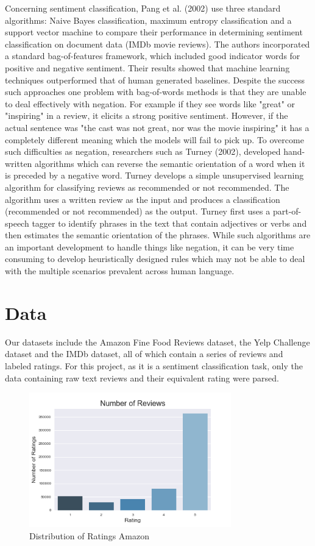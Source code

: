 \documentclass[conference]{IEEEtran}
\begin{document}
Concerning sentiment classification, Pang et al. (2002) use three standard algorithms: Naive Bayes classification, maximum entropy classification and a support vector machine to compare their performance in determining sentiment classification on document data (IMDb movie reviews). The authors incorporated a standard bag-of-features framework, which included good indicator words for positive and negative sentiment. Their results showed that machine learning techniques outperformed that of human generated baselines. Despite the success such approaches one problem with bag-of-words methods is that they are unable to deal effectively with negation. For example if they see words like "great" or "inspiring" in a review, it elicits a strong positive sentiment. However, if the actual sentence was "the cast was not great, nor was the movie inspiring" it has a completely different meaning which the models will fail to pick up. To overcome such difficulties as negation, researchers such as Turney (2002), developed hand-written algorithms which can reverse the semantic orientation of a word when it is preceded by a negative word. Turney develops a simple unsupervised learning algorithm for classifying reviews as recommended or not recommended.  The algorithm uses a written review as the input and produces a classification (recommended or not recommended) as the output. Turney first uses a part-of-speech tagger to identify phrases in the text that contain adjectives or verbs and then estimates the semantic orientation of the phrases. While such algorithms are an important development to handle things like negation, it can be very time consuming to develop heuristically designed rules which may not be able to deal with the multiple scenarios prevalent across human language. 


\section{Data}

Our datasets include the Amazon Fine Food Reviews dataset, the Yelp Challenge dataset and the IMDb dataset, all of which contain a series of reviews and labeled ratings. For this project, as it is a sentiment classification task, only the data containing raw text reviews and their equivalent rating were parsed. 

\begin{figure}[ht!] %
\centering
\includegraphics[width=3.45in]{aff.png}
\caption{ Distribution of Ratings Amazon}
\label{picture}
\end{figure}
\end{document}

